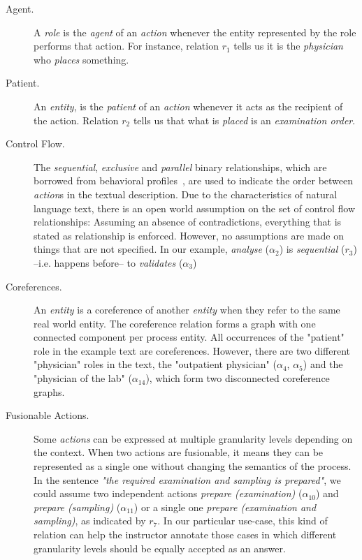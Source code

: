 \begin{description}
\item[Agent.]{A \emph{role} is the \emph{agent} of an \emph{action} whenever the
    entity represented by the role performs that action. 
    For instance, relation $r_1$ tells us it is the \emph{physician} who \emph{places} something.}
\item[Patient.]{An \emph{entity}, is the \emph{patient} of an \emph{action}
    whenever it acts as the recipient of the action. Relation $r_2$ tells us
    that what is \emph{placed} is an \emph{examination order}.}
\item[Control Flow.]{The \emph{sequential}, \emph{exclusive} and \emph{parallel}
    binary relationships, which are borrowed from behavioral
    profiles~\cite{smirnov2010business}, are used to indicate the order between \emph{action}s
    in the textual description. Due to the characteristics of natural language
    text, there is an open world assumption on the set of control flow
    relationships: Assuming an absence of contradictions, everything that is
    stated as relationship is enforced. However, no assumptions are made on
    things that are not specified. 
    In our example, \emph{analyse} ($\alpha_2$) is \emph{sequential} ($r_3$) --i.e. happens before--
    to \emph{validates} ($\alpha_3$)}
\item[Coreferences.]{An \emph{entity} is a coreference of another \emph{entity} when
    they refer to the same real world entity. The coreference relation forms a graph with
    one connected component per process entity. All occurrences of the "patient" role in the
    example text are coreferences. However, there are two different "physician" 
    roles in the text, the "outpatient physician" ($\alpha_4$, $\alpha_5$) and the 
    "physician of the lab" ($\alpha_{14}$), which form two disconnected coreference graphs.}
\item[Fusionable Actions.]{Some \emph{actions} can be expressed at multiple
    granularity levels depending on the context. When two actions are
    fusionable, it means they can be represented as a single one without
    changing the semantics of the process. In the sentence \emph{"the required examination 
    and sampling is prepared"}, we could assume two independent actions \emph{prepare 
    (examination)} ($\alpha_{10}$) and \emph{prepare (sampling)} ($\alpha_{11}$) or a single 
    one \emph{prepare (examination  and sampling)}, as indicated by $r_7$. In our particular
    use-case, this kind of relation can help the instructor annotate those cases in which different
    granularity levels should be equally accepted as an answer.}
\end{description}

